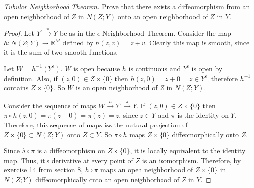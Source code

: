 \documentclass[12pt]{article}
\newcommand{\R}{\mathbb{R}}
\newenvironment{exercise}[2][Exercise]{\begin{trivlist}
\item[\hskip \labelsep {\bfseries #1}\hskip \labelsep {\bfseries #2.}]}{\end{trivlist}}
\begin{document}
\begin{exercise}{3}

\emph{Tubular Neighborhood Theorem.}  Prove that there exists a diffeomorphism from an open neighborhood of $Z$ in $N(Z;Y)$ onto an open neighborhood of $Z$ in $Y$.

\begin{proof}

Let $Y^\epsilon \xrightarrow{\pi} Y$ be as in the $\epsilon$-Neighborhood Theorem.  Consider the map $h:N(Z;Y) \rightarrow \R^M$ defined by $h(z,v) = z + v$.  Clearly this map is smooth, since it is the sum of two smooth functions.

Let $W = h^{-1}(Y^\epsilon)$.  $W$ is open because $h$ is continuous and $Y^\epsilon$ is open by definition.  Also, if $(z,0) \in Z \times \{0\}$ then $h(z,0) = z + 0 = z \in Y^\epsilon$, therefore $h^{-1}$ contains $Z \times \{0\}$.  So $W$ is an open neighborhood of $Z$ in $N(Z;Y)$.

Consider the sequence of maps $W \xrightarrow{h} Y^\epsilon \xrightarrow{\pi} Y$.  If $(z,0) \in Z \times \{0\}$ then $\pi \circ h (z,0) = \pi (z+0) = \pi(z) = z$, since $z \in Y$ and $\pi$ is the identity on $Y$.  Therefore, this sequence of maps iss the natural projection of $Z \times \{0\} \subset N(Z;Y)$ onto $Z \subset Y$.  So $\pi \circ h$ maps $Z \times \{0\}$ diffeomorphically onto $Z$.

Since $h \circ \pi$ is a diffeomorphism on $Z \times \{0\}$, it is locally equivalent to the identity map.  Thus, it's derivative at every point of $Z$ is an isomorphism.  Therefore, by exercise 14 from section 8, $h \circ \pi$ maps an open neighborhood of $Z \times \{0\}$ in $N(Z;Y)$ diffeomorphically onto an open neighborhood of $Z$ in $Y$.

\end{proof}

\end{exercise}
\end{document}
